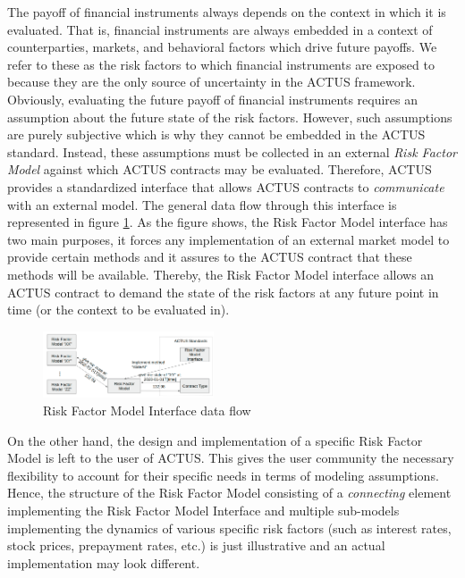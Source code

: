 \documentclass[9pt,oneside]{amsart}
\begin{document}
\begin{multicols}{2}
The payoff of financial instruments always depends on the context in which it is evaluated. That is, financial instruments are always embedded in a context of counterparties, markets, and behavioral factors which drive future payoffs. We refer to these as the risk factors to which financial instruments are exposed to because they are the only source of uncertainty in the ACTUS framework. Obviously, evaluating the future payoff of financial instruments requires an assumption about the future state of the risk factors. However, such assumptions are purely subjective which is why they cannot be embedded in the ACTUS standard. Instead, these assumptions must be collected in an external \textit{Risk Factor Model}  against which ACTUS contracts may be evaluated.  Therefore, ACTUS provides a standardized interface that allows ACTUS contracts to \textit{communicate}  with an external model. The general data flow through this interface is represented in figure \ref{fig:rf-interface}. As the figure shows, the Risk Factor Model interface has two main purposes, it forces any implementation of an external market model to provide certain methods and it assures to the ACTUS contract that these methods will be available. Thereby, the Risk Factor Model interface allows an ACTUS contract to demand the state of the risk factors at any future point in time (or the context to be evaluated in).



\begin{figure}[H]
	\centering
	\includegraphics[width=0.45\textwidth]{./media/rf-interface.png}
	\caption{Risk Factor Model Interface data flow}
	\label{fig:rf-interface}
\end{figure}




On the other hand, the design and implementation of a specific Risk Factor Model is left to the user of ACTUS. This gives the user community the necessary flexibility to account for their specific needs in terms of modeling assumptions. Hence, the structure of the Risk Factor Model consisting of a \textit{connecting} element implementing the Risk Factor Model Interface and multiple sub-models implementing the dynamics of various specific risk factors (such as interest rates, stock prices, prepayment rates, etc.) is just illustrative and an actual implementation may look different.


\end{multicols}
\end{document}
